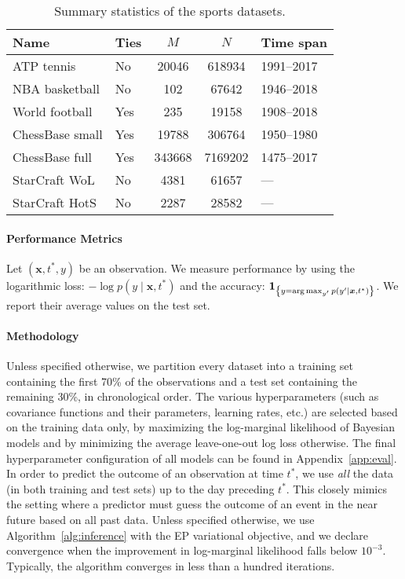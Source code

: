 \begin{table}
	\centering
	\caption{
		Summary statistics of the sports datasets.}
	\label{kks:tab:datasets}
	\begin{tabular}{l lS[table-format=6.0]S[table-format=7.0]l}
		\toprule
		Name            & Ties & $M$    & $N$     & Time span  \\
		\midrule
		ATP tennis      & No   & 20046  & 618934  & 1991--2017 \\
		NBA basketball  & No   & 102    & 67642   & 1946--2018 \\
		World football  & Yes  & 235    & 19158   & 1908--2018 \\
		ChessBase small & Yes  & 19788  & 306764  & 1950--1980 \\
		ChessBase full  & Yes  & 343668 & 7169202 & 1475--2017 \\
		\addlinespace
		StarCraft WoL   & No   & 4381   & 61657   & ---        \\
		StarCraft HotS  & No   & 2287   & 28582   & ---        \\
		\bottomrule
	\end{tabular}
\end{table}

\paragraph{Performance Metrics}
Let $(\bm{x}, t^*, y)$ be an observation.
We measure performance by using
the logarithmic loss: $-\log p(y \mid \bm{x}, t^*)$ and
the accuracy: $\bm{1}_{\left \{ y = \operatorname*{arg\,max}_{y'} p(y' \mid \bm{x}, t^*) \right \} }$.
We report their average values on the test set.

\paragraph{Methodology}
Unless specified otherwise, we partition every dataset into a training set containing the first 70\% of the observations and a test set containing the remaining 30\%, in chronological order.
The various hyperparameters (such as covariance functions and their parameters, learning rates, etc.) are selected based on the training data only, by maximizing the log-marginal likelihood of Bayesian models and by minimizing the average leave-one-out log loss otherwise.
The final hyperparameter configuration of all models can be found in Appendix~\ref{app:eval}.
In order to predict the outcome of an observation at time $t^*$, we use \emph{all} the data (in both training and test sets) up to the day preceding $t^*$.
This closely mimics the setting where a predictor must guess the outcome of an event in the near future based on all past data.
Unless specified otherwise, we use Algorithm~\ref{alg:inference} with the EP variational objective, and we declare convergence when the improvement in log-marginal likelihood falls below $10^{-3}$.
Typically, the algorithm converges in less than a hundred iterations.


